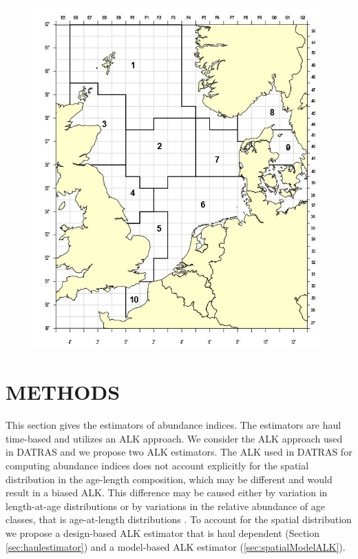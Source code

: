 \documentclass[a4paper 12pt]{article}
\numberwithin{equation}{section}
\begin{document}
\begin{figure}[h!]
  \centering
 {\includegraphics[width=11cm]{icesroundfishmap.jpg}}   
\end{figure}


\section{\large METHODS}
\label{sec:methods}
This section gives the estimators of abundance indices. The estimators are haul time-based and utilizes an ALK approach. We consider the ALK approach used in DATRAS and we propose two ALK estimators. The ALK used in DATRAS for computing abundance indices does not account explicitly for the spatial distribution in the age-length composition, which may be different and would result in a biased ALK. This difference may be caused either by variation in length-at-age distributions or by variations in the relative abundance of age classes, that is age-at-length distributions \citep{gerritsen2006simple}.  To account for the spatial distribution we propose a design-based ALK estimator that is haul dependent (Section \ref{sec:haulestimator}) and a model-based ALK estimator (\ref{sec:spatialModelALK}).
\end{document}
